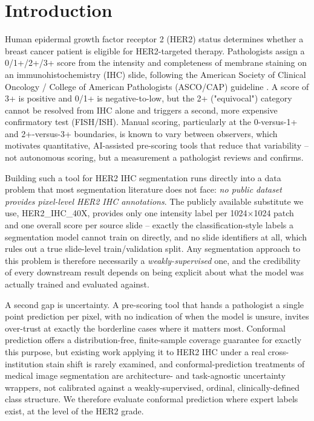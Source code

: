 \documentclass[conference]{IEEEtran}
\begin{document}
\section{Introduction}

Human epidermal growth factor receptor 2 (HER2) status determines whether a
breast cancer patient is eligible for HER2-targeted therapy. Pathologists
assign a 0/1+/2+/3+ score from the intensity and completeness of membrane
staining on an immunohistochemistry (IHC) slide, following the American
Society of Clinical Oncology / College of American Pathologists (ASCO/CAP)
guideline \cite{wolff2018}. A score of 3+ is positive and 0/1+ is
negative-to-low, but the 2+ ("equivocal") category cannot be resolved from
IHC alone and triggers a second, more expensive confirmatory test
(FISH/ISH). Manual scoring, particularly at the 0-versus-1+ and
2+-versus-3+ boundaries, is known to vary between observers, which
motivates quantitative, AI-assisted pre-scoring tools that reduce that
variability -- not autonomous scoring, but a measurement a pathologist
reviews and confirms.

Building such a tool for HER2 IHC segmentation runs directly into a data
problem that most segmentation literature does not face: \emph{no public
dataset provides pixel-level HER2 IHC annotations}. The publicly available
substitute we use, HER2\_IHC\_40X, provides only one intensity label per
1024$\times$1024 patch and one overall score per source slide -- exactly the
classification-style labels a segmentation model cannot train on directly,
and no slide identifiers at all, which rules out a true slide-level
train/validation split. Any segmentation approach to this problem is
therefore necessarily a \emph{weakly-supervised} one, and the credibility of
every downstream result depends on being explicit about what the model was
actually trained and evaluated against.

A second gap is uncertainty. A pre-scoring tool that hands a pathologist a
single point prediction per pixel, with no indication of when the model is
unsure, invites over-trust at exactly the borderline cases where it matters
most. Conformal prediction offers a distribution-free, finite-sample
coverage guarantee for exactly this purpose, but existing work applying it
to HER2 IHC under a real cross-institution stain shift is rarely examined, and
conformal-prediction treatments of medical image segmentation
\cite{mossina2025,borden2026} are architecture- and task-agnostic
uncertainty wrappers, not calibrated against a weakly-supervised,
ordinal, clinically-defined class structure. We therefore evaluate conformal
prediction where expert labels exist, at the level of the HER2 grade.
\end{document}
